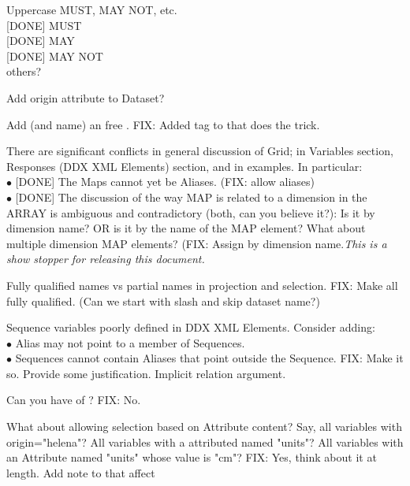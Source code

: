 \documentclass[justify]{dods-paper}
\begin{document}
\begin{description}
\item Uppercase MUST, MAY NOT, etc.\\[1mm]
[DONE] MUST \\[1mm]
[DONE] MAY \\[1mm]
[DONE] MAY NOT \\[1mm]
others?
 
\item [DONE] Add origin attribute to Dataset?

\item [DONE] Add (and name) an \Attribute free \DDX. FIX: Added tag to \CE 
that does the trick.
 
\item [DONE] There are significant conflicts in general discussion of Grid; in Variables section, Responses (DDX XML Elements) section, and in examples. 
In particular:\\[2mm]
$\bullet$ [DONE] The Maps cannot yet be Aliases. (FIX: allow aliases)\\
$\bullet$ [DONE] The discussion of the way MAP is related to a dimension in the ARRAY is ambiguous and contradictory (both, can you believe it?): Is it by dimension name? OR is it by the name of the MAP element? What about multiple dimension MAP elements? (FIX: Assign by dimension name.\emph{This is a show stopper for releasing this document.}
 
\item [DONE] Fully qualified names vs partial names in projection and selection. FIX: Make all fully qualified. (Can we start with slash and skip dataset name?)

 
\item [DONE] Sequence variables poorly defined in DDX XML Elements. Consider adding:\\[2mm] $\bullet$ Alias may not point to a member of Sequences.\\
$\bullet$ Sequences cannot contain Aliases that point outside the Sequence.
FIX: Make it so. Provide some justification. Implicit relation argument.

\item [DONE] Can you have \Arrays of \Enums? FIX: No.

\item [DONE] What about allowing selection based on Attribute content? Say, all variables with origin="helena"? All variables with a attributed named "units"? All variables with an Attribute named "units" whose value is "cm"? FIX: Yes, think about it at length. Add note to that affect


\end{description}
\end{document}

